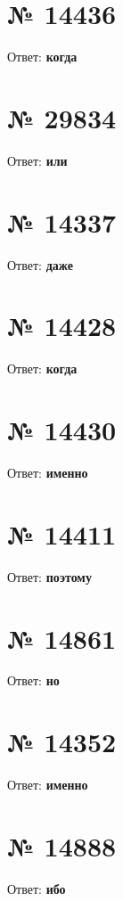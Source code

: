 \documentclass[11pt]{article} %
\begin{document}
\section{№ \textbf{14436}}

Ответ: \textbf{когда}

\section{№ \textbf{29834}}

Ответ: \textbf{или}

\section{№ \textbf{14337}}

Ответ: \textbf{даже}

\section{№ \textbf{14428}}

Ответ: \textbf{когда}

\section{№ \textbf{14430}}

Ответ: \textbf{именно}

\section{№ \textbf{14411}}

Ответ: \textbf{поэтому}

\section{№ \textbf{14861}}

Ответ: \textbf{но}

\section{№ \textbf{14352}}

Ответ: \textbf{именно}

\section{№ \textbf{14888}}

Ответ: \textbf{ибо}
\end{document}
